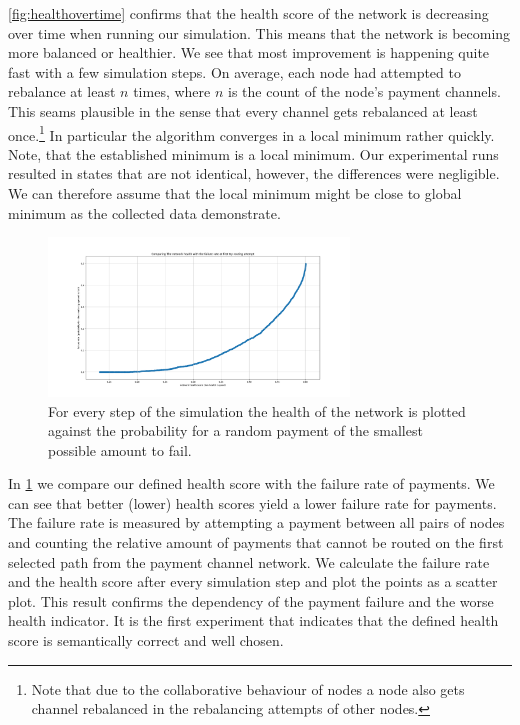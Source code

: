 \documentclass[a4paper]{paper}
\begin{document}
\cref{fig:healthovertime} confirms that the health score of the network is decreasing over time when running our simulation.
This means that the network is becoming more balanced or healthier.
We see that most improvement is happening quite fast with a few simulation steps.
On average, each node had attempted to rebalance at least $n$ times, where $n$ is the count of the node's payment channels.
This seams plausible in the sense that every channel gets rebalanced at least once.\footnote{Note that due to the collaborative behaviour of nodes a node also gets channel rebalanced in the rebalancing attempts of other nodes.} 
In particular the algorithm converges in a local minimum rather quickly.
Note, that the established minimum is a local minimum. 
Our experimental runs resulted in states that are not identical, however, the differences were negligible. 
We can therefore assume that the local minimum might be close to global minimum as the collected data demonstrate.

\begin{figure}
 \centering
 \includegraphics[width=8cm]{code/results/routabilityTest/health vs payment rate.png}
 \caption{For every step of the simulation the health of the network is plotted against the probability for a random payment of the smallest possible amount to fail.}
 \label{fig:healthVsFailurerate}
\end{figure}

In \cref{fig:healthVsFailurerate} we compare our defined health score with the failure rate of payments.
We can see that better (lower) health scores yield a lower failure rate for payments.
The failure rate is measured by attempting a payment between all pairs of nodes and counting the relative amount of payments that cannot be routed on the first selected path from the payment channel network.
We calculate the failure rate and the health score after every simulation step and plot the points as a scatter plot.
This result confirms the dependency of the payment failure and the worse health indicator. It is the first experiment that indicates that the defined health score is semantically correct and well chosen. 
\end{document}
